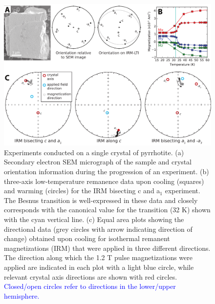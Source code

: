 \documentclass[draft,gc]{AGUTeX}
\begin{document}
\begin{figure}
\noindent\includegraphics[width=\textwidth]{Pyrrhotite1.pdf}
\caption{Experiments conducted on a single crystal of pyrrhotite. (a) Secondary electron SEM micrograph of the sample and crystal orientation information during the progression of an experiment. (b) three-axis low-temperature remanence data upon cooling (squares) and warming (circles) for the IRM bisecting c and a$_1$ experiment. The Besnus transition is well-expressed in these data and closely corresponds with the canonical value for the transition (32 K) shown with the cyan vertical line. (c) Equal area plots showing the directional data (grey circles with arrow indicating direction of change) obtained upon cooling for isothermal remanent magnetizations (IRM) that were applied in three different directions. The direction along which the 1.2 T pulse magnetizations were applied are indicated in each plot with a light blue circle, while relevant crystal axis directions are shown with red circles. \textcolor{blue}{Closed/open circles refer to directions in the lower/upper hemisphere.}}
\label{fig:pyrrhotite}
\end{figure}
\end{document}

